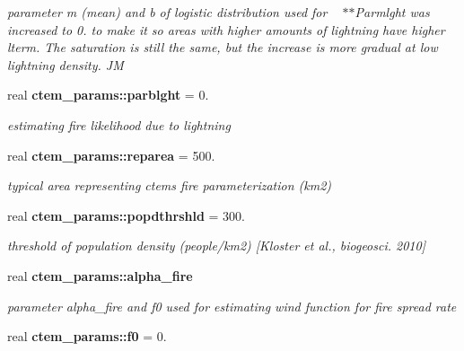 \begin{DoxyCompactItemize}
\begin{DoxyCompactList}\small\item\em parameter m (mean) and b of logistic distribution used for ~\newline
$\ast$$\ast$\+Parmlght was increased to 0. to make it so areas with higher amounts of lightning have higher lterm. The saturation is still the same, but the increase is more gradual at low lightning density. J\+M \end{DoxyCompactList}\item 
\hypertarget{namespacectem__params_a1b407a06b92feb424b8338ff8c19e966}{}real {\bfseries ctem\+\_\+params\+::parblght} = 0.\label{namespacectem__params_a1b407a06b92feb424b8338ff8c19e966}

\begin{DoxyCompactList}\small\item\em estimating fire likelihood due to lightning \end{DoxyCompactList}\item 
\hypertarget{namespacectem__params_a7f4c73f924960839ad06590397b9855b}{}real {\bfseries ctem\+\_\+params\+::reparea} = 500.\label{namespacectem__params_a7f4c73f924960839ad06590397b9855b}

\begin{DoxyCompactList}\small\item\em typical area representing ctem\textquotesingle{}s fire parameterization (km2) \end{DoxyCompactList}\item 
\hypertarget{namespacectem__params_a0a275d244526015c0b2ea9dc397c2256}{}real {\bfseries ctem\+\_\+params\+::popdthrshld} = 300.\label{namespacectem__params_a0a275d244526015c0b2ea9dc397c2256}

\begin{DoxyCompactList}\small\item\em threshold of population density (people/km2) \mbox{[}Kloster et al., biogeosci. 2010\mbox{]} \end{DoxyCompactList}\item 
\hypertarget{namespacectem__params_aa722898e44ec14ac7b561ee2917529a5}{}real {\bfseries ctem\+\_\+params\+::alpha\+\_\+fire}\label{namespacectem__params_aa722898e44ec14ac7b561ee2917529a5}

\begin{DoxyCompactList}\small\item\em parameter alpha\+\_\+fire and f0 used for estimating wind function for fire spread rate \end{DoxyCompactList}\item 
\hypertarget{namespacectem__params_af0e5f58c072516e8d0d757f843161bc5}{}real {\bfseries ctem\+\_\+params\+::f0} = 0.\label{namespacectem__params_af0e5f58c072516e8d0d757f843161bc5}


\end{DoxyCompactItemize}
